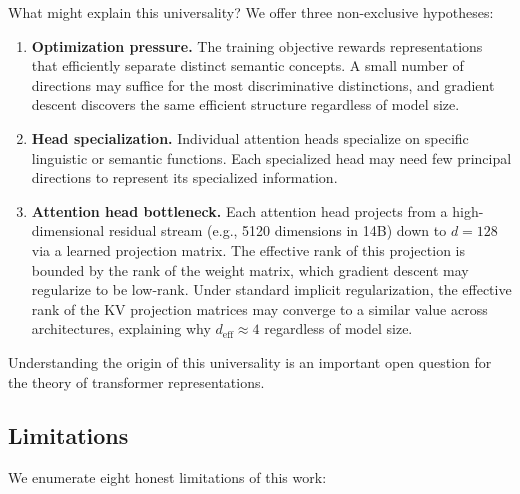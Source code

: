 \documentclass[11pt]{article}
\newcommand{\deff}{d_{\mathrm{eff}}}
\begin{document}
What might explain this universality?  We offer three non-exclusive hypotheses:
\begin{enumerate}[leftmargin=2em]
\item \textbf{Optimization pressure.}  The training objective rewards
representations that efficiently separate distinct semantic concepts.  A small
number of directions may suffice for the most discriminative distinctions, and
gradient descent discovers the same efficient structure regardless of model size.
\item \textbf{Head specialization.}  Individual attention heads specialize on
specific linguistic or semantic functions.  Each specialized head may need few
principal directions to represent its specialized information.
\item \textbf{Attention head bottleneck.}  Each attention head projects from a
high-dimensional residual stream (e.g., 5120 dimensions in 14B) down to $d =
128$ via a learned projection matrix.  The effective rank of this projection is
bounded by the rank of the weight matrix, which gradient descent may regularize
to be low-rank.  Under standard implicit regularization, the effective rank of
the KV projection matrices may converge to a similar value across architectures,
explaining why $\deff \approx 4$ regardless of model size.
\end{enumerate}

Understanding the origin of this universality is an important open question for
the theory of transformer representations.

\subsection{Limitations}
\label{sec:limitations}

We enumerate eight honest limitations of this work:
\end{document}
